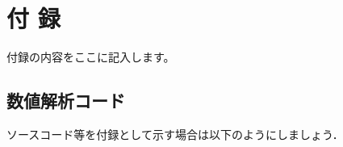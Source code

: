\appendix
    \chapter*{付 録}
        付録の内容をここに記入します。
        
            \section{数値解析コード}
            ソースコード等を付録として示す場合は以下のようにしましょう．
            